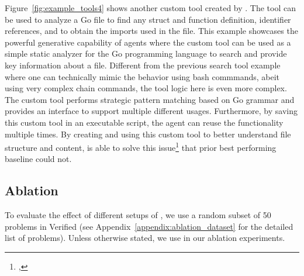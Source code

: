 Figure~\ref{fig:example_tools4} shows another custom tool  created by \tech. 
The tool can be used to analyze a Go file to find any struct and function definition, identifier references, and to obtain the imports used in the file.
This example showcases the powerful generative capability of agents where the custom tool can be used as a simple static analyzer for the Go programming language to search and provide key information about a file.
Different from the previous search tool example where one can technically mimic the behavior using bash commmands, abeit using very complex chain commands, the tool logic here is even more complex.
The custom tool performs strategic pattern matching based on Go grammar and provides an interface to support multiple different usages.
Furthermore, by saving this custom tool in an executable script, the agent can reuse the functionality multiple times.
By creating and using this custom tool to better understand file structure and content, \tech is able to solve this issue\footnote{, \swebenchpro{}} that prior best performing baseline could not.

\subsection{Ablation}
\label{sec:ablation}

To evaluate the effect of different setups of \tech, we use a random subset of 50 problems in \swebench Verified (see Appendix~\ref{appendix:ablation_dataset} for the detailed list of problems).
Unless otherwise stated, we use \claudesonnetfourfive{} in our ablation experiments.

\begin{table}[t!]
\centering
\caption{Ablation result across \tech setups on subset of \swebench Verified problems}
\label{tab:ablation_setup}
\end{table}

